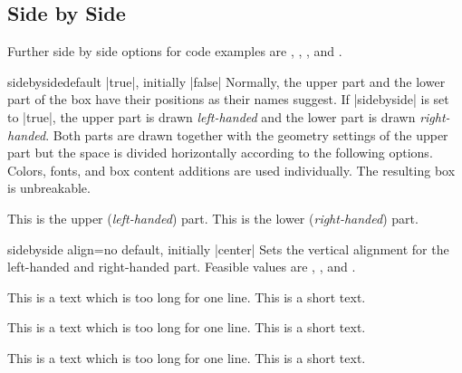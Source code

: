 \clearpage
\subsection{Side by Side}\label{subsec:sidebyside}
\begin{marker}
  Further side by side options for code examples are
  ,
  ,
  , and
  .
\end{marker}

\begin{docTcbKey}{sidebyside}{}{default |true|, initially |false|}
Normally, the upper part and the lower part of the box have their positions
as their names suggest. If |sidebyside| is set to |true|, the upper part
is drawn \emph{left-handed} and the lower part is drawn \emph{right-handed}.
Both parts are drawn together with the geometry settings of the upper part but the
space is divided horizontally according to the following options.
Colors, fonts, and box content additions are used individually.
The resulting box is unbreakable.

\begin{dispExample}

\begin{tcolorbox}[title=My title,sidebyside]
This is the upper (\textit{left-handed}) part.
\tcblower
This is the lower (\textit{right-handed}) part.
\end{tcolorbox}
\end{dispExample}
\end{docTcbKey}


\begin{docTcbKey}{sidebyside align}{=}{no default, initially |center|}
  Sets the vertical alignment for the left-handed and right-handed part.
  Feasible values are , , and .
\begin{dispExample}

\begin{tcolorbox}[adjusted title=center,sidebyside align=center]
This is a text which is too long for one line.
\tcblower
This is a short text.
\end{tcolorbox}\hfill
\begin{tcolorbox}[adjusted title=top,sidebyside align=top]
This is a text which is too long for one line.
\tcblower
This is a short text.
\end{tcolorbox}\hfill
\begin{tcolorbox}[adjusted title=bottom,sidebyside align=bottom]
This is a text which is too long for one line.
\tcblower
This is a short text.
\end{tcolorbox}
\end{dispExample}
\end{docTcbKey}


